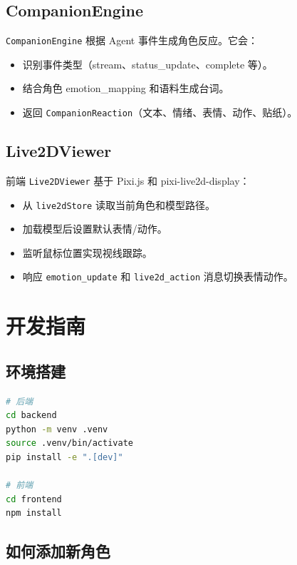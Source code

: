 \documentclass[12pt,a4paper]{article}
\begin{document}
\subsection{CompanionEngine}

\texttt{CompanionEngine} 根据 Agent 事件生成角色反应。它会：

\begin{itemize}[leftmargin=2em]
  \item 识别事件类型（stream、status\_update、complete 等）。
  \item 结合角色 emotion\_mapping 和语料生成台词。
  \item 返回 \texttt{CompanionReaction}（文本、情绪、表情、动作、贴纸）。
\end{itemize}

\subsection{Live2DViewer}

前端 \texttt{Live2DViewer} 基于 Pixi.js 和 pixi-live2d-display：

\begin{itemize}[leftmargin=2em]
  \item 从 \texttt{live2dStore} 读取当前角色和模型路径。
  \item 加载模型后设置默认表情/动作。
  \item 监听鼠标位置实现视线跟踪。
  \item 响应 \texttt{emotion\_update} 和 \texttt{live2d\_action} 消息切换表情动作。
\end{itemize}

\section{开发指南}

\subsection{环境搭建}

\begin{lstlisting}[language=bash]
# 后端
cd backend
python -m venv .venv
source .venv/bin/activate
pip install -e ".[dev]"

# 前端
cd frontend
npm install
\end{lstlisting}

\subsection{如何添加新角色}
\end{document}

